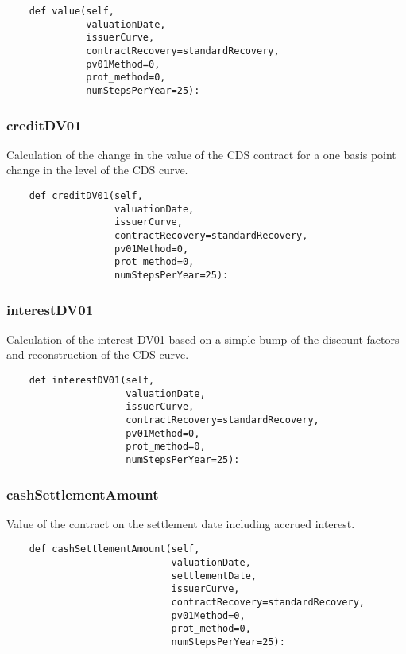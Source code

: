 \documentclass[twoside,11pt]{book}
\begin{document}
\begin{lstlisting}
    def value(self,
              valuationDate,
              issuerCurve,
              contractRecovery=standardRecovery,
              pv01Method=0,
              prot_method=0,
              numStepsPerYear=25):
\end{lstlisting}

\subsubsection*{{\bf creditDV01}}
Calculation of the change in the value of the CDS contract for a one basis point change in the level of the CDS curve. 

\begin{lstlisting}
    def creditDV01(self,
                   valuationDate,
                   issuerCurve,
                   contractRecovery=standardRecovery,
                   pv01Method=0,
                   prot_method=0,
                   numStepsPerYear=25):
\end{lstlisting}

\subsubsection*{{\bf interestDV01}}
Calculation of the interest DV01 based on a simple bump of the discount factors and reconstruction of the CDS curve.  

\begin{lstlisting}
    def interestDV01(self,
                     valuationDate,
                     issuerCurve,
                     contractRecovery=standardRecovery,
                     pv01Method=0,
                     prot_method=0,
                     numStepsPerYear=25):
\end{lstlisting}

\subsubsection*{{\bf cashSettlementAmount}}
Value of the contract on the settlement date including accrued interest.  

\begin{lstlisting}
    def cashSettlementAmount(self,
                             valuationDate,
                             settlementDate,
                             issuerCurve,
                             contractRecovery=standardRecovery,
                             pv01Method=0,
                             prot_method=0,
                             numStepsPerYear=25):
\end{lstlisting}
\end{document}

